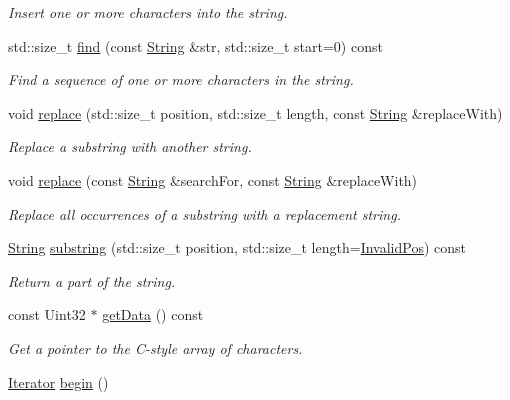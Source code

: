 \begin{DoxyCompactItemize}
\begin{DoxyCompactList}\small\item\em Insert one or more characters into the string. \end{DoxyCompactList}\item 
std\+::size\+\_\+t \hyperlink{classsf_1_1String_aa189ec8656854106ab8d2e935fd9cbcc}{find} (const \hyperlink{classsf_1_1String}{String} \&str, std\+::size\+\_\+t start=0) const
\begin{DoxyCompactList}\small\item\em Find a sequence of one or more characters in the string. \end{DoxyCompactList}\item 
void \hyperlink{classsf_1_1String_ad460e628c287b0fa88deba2eb0b6744b}{replace} (std\+::size\+\_\+t position, std\+::size\+\_\+t length, const \hyperlink{classsf_1_1String}{String} \&replace\+With)
\begin{DoxyCompactList}\small\item\em Replace a substring with another string. \end{DoxyCompactList}\item 
void \hyperlink{classsf_1_1String_a82bbfee2bf23c641e5361ad505c07921}{replace} (const \hyperlink{classsf_1_1String}{String} \&search\+For, const \hyperlink{classsf_1_1String}{String} \&replace\+With)
\begin{DoxyCompactList}\small\item\em Replace all occurrences of a substring with a replacement string. \end{DoxyCompactList}\item 
\hyperlink{classsf_1_1String}{String} \hyperlink{classsf_1_1String_a492645e00032455e6d92ff0e992654ce}{substring} (std\+::size\+\_\+t position, std\+::size\+\_\+t length=\hyperlink{classsf_1_1String_abaadecaf12a6b41c54d725c75fd28527}{Invalid\+Pos}) const
\begin{DoxyCompactList}\small\item\em Return a part of the string. \end{DoxyCompactList}\item 
const Uint32 $\ast$ \hyperlink{classsf_1_1String_a0b38001f1a6b7bdf35bb180da5391929}{get\+Data} () const
\begin{DoxyCompactList}\small\item\em Get a pointer to the C-\/style array of characters. \end{DoxyCompactList}\item 
\hyperlink{classsf_1_1String_ac90f2b7b28f703020f8d027e98806235}{Iterator} \hyperlink{classsf_1_1String_a8ec30ddc08e3a6bd11c99aed782f6dfe}{begin} ()

\end{DoxyCompactItemize}
